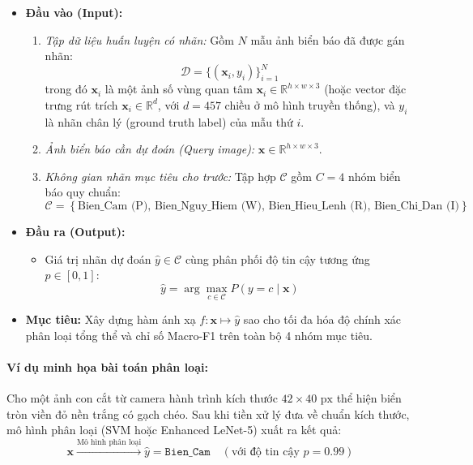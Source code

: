 \begin{itemize}
    \item \textbf{Đầu vào (Input):}
    \begin{enumerate}
        \item \textit{Tập dữ liệu huấn luyện có nhãn:} Gồm $N$ mẫu ảnh biển báo đã được gán nhãn:
        \begin{equation}
            \mathcal{D} = \{(\mathbf{x}_i, y_i)\}_{i=1}^{N}
        \end{equation}
        trong đó $\mathbf{x}_i$ là một ảnh số vùng quan tâm $\mathbf{x}_i \in \mathbb{R}^{h \times w \times 3}$ (hoặc vector đặc trưng rút trích $\mathbf{x}_i \in \mathbb{R}^d$, với $d=457$ chiều ở mô hình truyền thống), và $y_i$ là nhãn chân lý (ground truth label) của mẫu thứ $i$.
        \item \textit{Ảnh biển báo cần dự đoán (Query image):} $\mathbf{x} \in \mathbb{R}^{h \times w \times 3}$.
        \item \textit{Không gian nhãn mục tiêu cho trước:} Tập hợp $\mathcal{C}$ gồm $C = 4$ nhóm biển báo quy chuẩn:
        \begin{equation}
            \mathcal{C} = \left\{ \text{Bien\_Cam (P)}, \, \text{Bien\_Nguy\_Hiem (W)}, \, \text{Bien\_Hieu\_Lenh (R)}, \, \text{Bien\_Chi\_Dan (I)} \right\}
            \label{eq:classes}
        \end{equation}
    \end{enumerate}

    \item \textbf{Đầu ra (Output):}
    \begin{itemize}
        \item Giá trị nhãn dự đoán $\hat{y} \in \mathcal{C}$ cùng phân phối độ tin cậy tương ứng $p \in [0, 1]$:
        \begin{equation}
            \hat{y} = \arg\max_{c \in \mathcal{C}} P(y = c \mid \mathbf{x})
        \end{equation}
    \end{itemize}
    \item \textbf{Mục tiêu:} Xây dựng hàm ánh xạ $f: \mathbf{x} \mapsto \hat{y}$ sao cho tối đa hóa độ chính xác phân loại tổng thể và chỉ số Macro-F1 trên toàn bộ 4 nhóm mục tiêu.
\end{itemize}

\paragraph{Ví dụ minh họa bài toán phân loại:}
Cho một ảnh con cắt từ camera hành trình kích thước $42 \times 40\text{ px}$ thể hiện biển tròn viền đỏ nền trắng có gạch chéo. Sau khi tiền xử lý đưa về chuẩn kích thước, mô hình phân loại (SVM hoặc Enhanced LeNet-5) xuất ra kết quả:
\begin{equation*}
    \mathbf{x} \xrightarrow{\text{Mô hình phân loại}} \hat{y} = \texttt{Bien\_Cam} \quad (\text{với độ tin cậy } p = 0.99)
\end{equation*}

